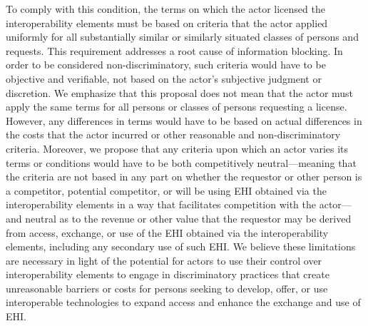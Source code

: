 \documentclass[twoside,11pt]{article}
\begin{document}
          To comply with this condition, the terms on which the actor licensed the interoperability elements must be based on criteria that the actor applied uniformly for all substantially similar or similarly situated classes of persons and requests. This requirement addresses a root cause of information blocking. In order to be considered non-discriminatory, such criteria would have to be objective and verifiable, not based on the actor's subjective judgment or discretion. We emphasize that this proposal does not mean that the actor must apply the same terms for all persons or classes of persons requesting a license. However, any differences in terms would have to be based on actual differences in the costs that the actor incurred or other reasonable and non-discriminatory criteria. Moreover, we propose that any criteria upon which an actor varies its terms or conditions would have to be both competitively neutral—meaning that the criteria are not based in any part on whether the requestor or other person is a competitor, potential competitor, or will be using EHI obtained via the interoperability elements in a way that facilitates competition with the actor—and neutral as to the revenue or other value that the requestor may be derived from access, exchange, or use of the EHI obtained via the interoperability elements, including any secondary use of such EHI. We believe these limitations are necessary in light of the potential for actors to use their control over interoperability elements to engage in discriminatory practices that create unreasonable barriers or costs for persons seeking to develop, offer, or use interoperable technologies to expand access and enhance the exchange and use of EHI.
\end{document}

